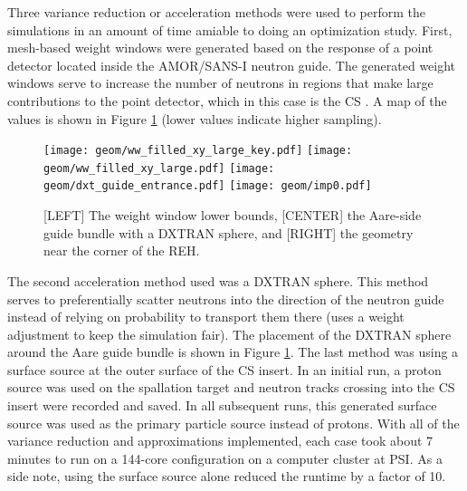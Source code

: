 \documentclass[a4paper]{jpconf}
\begin{document}
Three variance reduction or acceleration methods were used to perform the simulations in an amount of time amiable to doing an optimization study.  First, mesh-based weight windows were generated based on the response of a point detector located inside the AMOR/SANS-I neutron guide.  The generated weight windows serve to increase the number of neutrons in regions that make large contributions to the point detector, which in this case is the CS \cite{mcnp5,mcnp6}.  A map of the values is shown in Figure \ref{var_red} (lower values indicate higher sampling).

\begin{figure}[h!]
\begin{center}
\texttt{[image: geom/ww\_filled\_xy\_large\_key.pdf]} 
\texttt{[image: geom/ww\_filled\_xy\_large.pdf]} 
\texttt{[image: geom/dxt\_guide\_entrance.pdf]}
\texttt{[image: geom/imp0.pdf]}
\end{center}
\caption{\label{var_red} [LEFT] The weight window lower bounds, [CENTER] the Aare-side guide bundle with a DXTRAN sphere, and [RIGHT] the geometry near the corner of the REH.}
\end{figure}

The second acceleration method used was a DXTRAN sphere.  This method serves to preferentially scatter neutrons into the direction of the neutron guide instead of relying on probability to transport them there (uses a weight adjustment to keep the simulation fair).  The placement of the DXTRAN sphere around the Aare guide bundle is shown in Figure \ref{var_red}.  The last method was using a surface source at the outer surface of the CS insert.  In an initial run, a proton source was used on the spallation target and neutron tracks crossing into the CS insert were recorded and saved.  In all subsequent runs, this generated surface source was used as the primary particle source instead of protons.  With all of the variance reduction and approximations implemented, each case took about 7 minutes to run on a 144-core configuration on a computer cluster at PSI.  As a side note, using the surface source alone reduced the runtime by a factor of 10.  %
\end{document}
